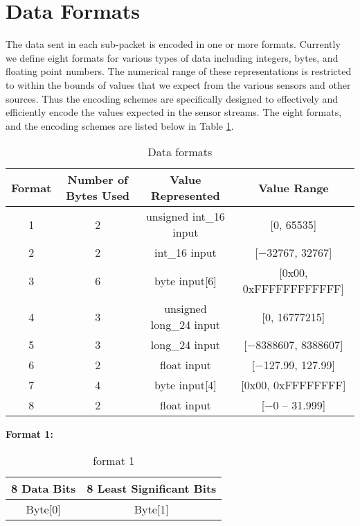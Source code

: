 \newpage
\section{Data Formats}

The data sent in each sub-packet is encoded in one or more formats. Currently
we define eight formats for various types of data including integers, bytes,
and floating point numbers. The numerical range of these representations is
restricted to within the bounds of values that we expect from the various sensors
and other sources. Thus the encoding schemes are specifically designed to
effectively and efficiently encode the values expected in the sensor streams.
The eight formats, and the encoding schemes are listed below in Table \ref{table:overall}.
\\

\begin{table}[H]
    \centering
    {
    \begin{tabular}{|c|c|c|c|}
        \hline
        \textbf{Format} & \textbf{Number of Bytes Used} & \textbf{Value Represented} & \textbf{Value Range} \\ \hline
        1 & 2 & unsigned int\_16 input & [0, 65535] \\
        2 & 2 & int\_16 input & [$-$32767, 32767] \\
        3 & 6 & byte input[6] & [0x00, 0xFFFFFFFFFFFF] \\
        4 & 3 & unsigned long\_24 input & [0, 16777215] \\
        5 & 3 & long\_24 input & [$-$8388607, 8388607] \\
        6 & 2 & float input & [$-$127.99, 127.99] \\
        7 & 4 & byte input[4] & [0x00, 0xFFFFFFFF] \\
        8 & 2 & float input & [$-$0 -- 31.999] \\
        \hline
    \end{tabular}
    }
    \caption{Data formats}
    \label{table:overall}
\end{table}


\textbf{Format 1:}
\begin{table}[H]
    \centering
    {
    \begin{tabular}{|c|c|}
        \hline
        \rowcolor{black!8}
        \textbf{8 Data Bits} & \textbf{8 Least Significant Bits} \\ \hline
        Byte[0] & Byte[1] \\ \hline
    \end{tabular}
    }
    \caption{format 1}
    \label{table:format1}
\end{table}


